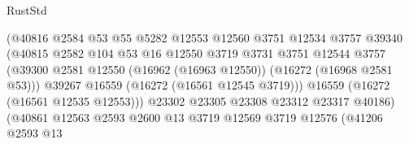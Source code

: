 \begin{lexlean}{RustStd}
\begin{coremodule}
                                          (@40816
                                            @2584
                                            @53
                                            @55
                                            @5282
                                            @12553
                                            @12560
                                            @3751
                                            @12534
                                            @3757
                                            @39340
                                            (@40815
                                              @2582
                                              @104
                                              @53
                                              @16
                                              @12550
                                              @3719
                                              @3731
                                              @3751
                                              @12544
                                              @3757
                                              (@39300
                                                @2581
                                                @12550
                                                (@16962 (@16963 @12550))
                                                (@16272 (@16968 @2581 @53)))
                                              @39267
                                              @16559
                                              (@16272 (@16561 @12545 @3719)))
                                            @16559
                                            (@16272 (@16561 @12535 @12553)))
                                          @23302
                                          @23305
                                          @23308
                                          @23312
                                          @23317
                                          @40186)
                                        (@40861
                                          @12563
                                          @2593
                                          @2600
                                          @13
                                          @3719
                                          @12569
                                          @3719
                                          @12576
                                          (@41206
                                            @2593
                                            @13

\end{coremodule}
\end{lexlean}

